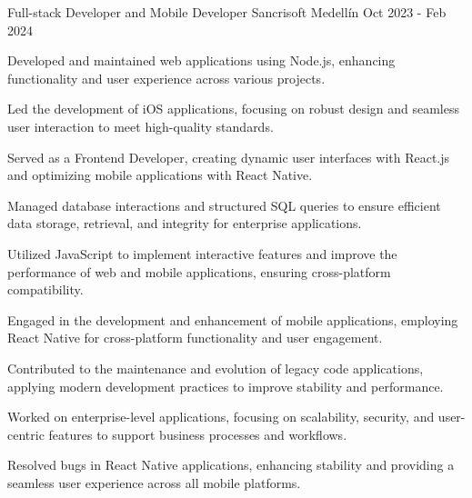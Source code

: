 \newcommand{\quotes}[1]{``#1''}

\begin{cventries}

\cventry
{Full-stack Developer and Mobile Developer} %
{Sancrisoft} %
{Medellín} %
{Oct 2023 - Feb 2024} %
{
  \begin{cvitems} %
    \item {Developed and maintained web applications using Node.js, enhancing functionality and user experience across various projects.}
    \item {Led the development of iOS applications, focusing on robust design and seamless user interaction to meet high-quality standards.}
    \item {Served as a Frontend Developer, creating dynamic user interfaces with React.js and optimizing mobile applications with React Native.}
    \item {Managed database interactions and structured SQL queries to ensure efficient data storage, retrieval, and integrity for enterprise applications.}
    \item {Utilized JavaScript to implement interactive features and improve the performance of web and mobile applications, ensuring cross-platform compatibility.}
    \item {Engaged in the development and enhancement of mobile applications, employing React Native for cross-platform functionality and user engagement.}
    \item {Contributed to the maintenance and evolution of legacy code applications, applying modern development practices to improve stability and performance.}
    \item {Worked on enterprise-level applications, focusing on scalability, security, and user-centric features to support business processes and workflows.}
    \item {Resolved bugs in React Native applications, enhancing stability and providing a seamless user experience across all mobile platforms.}
  \end{cvitems}
}
\end{cventries}
